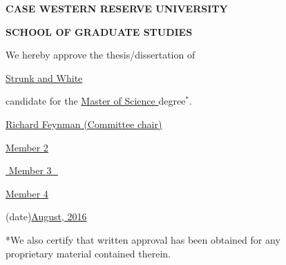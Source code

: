 \newpage

\begin{center}
\begin{center}
\textbf{CASE WESTERN RESERVE UNIVERSITY}
\end{center}
\begin{center}
\textbf{SCHOOL OF GRADUATE STUDIES}
\end{center}
\vfill
\large


We hereby approve the thesis/dissertation of
\begin{center}\underline{\quad\quad\quad\quad\quad Strunk and White \quad\quad\quad\quad\quad}\end{center}

candidate for the \underline{\quad\quad\quad Master of Science \quad\quad\quad} degree$^*$.
\vfill
\begin{center}\underline{\; Richard Feynman (Committee chair) \;}\end{center}
\begin{center}\underline{\quad\quad\quad\quad\quad Member 2 \quad\quad\quad\quad\quad}\end{center}
\begin{center}\underline{\,\,\quad\quad\quad\quad Member 3 \quad\quad\quad\quad\,\,}\end{center}
\begin{center}\underline{\;\;\;\quad\quad\quad Member 4 \quad\quad\quad\;\;\;}\end{center}

\vfill
\begin{center}(date)\underline{\quad\quad August, 2016 \quad\quad}\end{center}
\vfill

*We also certify that written approval has been obtained for any\\
proprietary material contained therein. 


\end{center}
\normalsize
